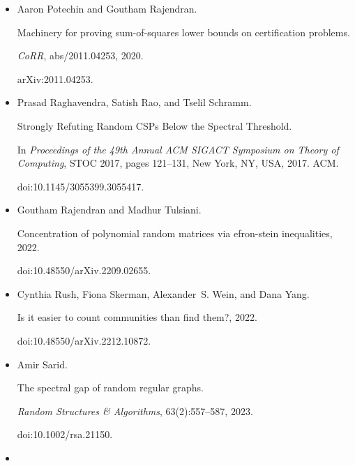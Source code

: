 \documentclass[10pt,a4paper]{article}
\begin{document}
\begin{itemize}
\item[] 
[39]

Aaron Potechin and Goutham Rajendran.


Machinery for proving sum-of-squares lower bounds on certification
problems.


\emph{CoRR}, abs/2011.04253, 2020.


arXiv:2011.04253.





\item[] 
[40]

Prasad Raghavendra, Satish Rao, and Tselil Schramm.


Strongly Refuting Random CSPs Below the Spectral Threshold.


In \emph{Proceedings of the 49th Annual ACM SIGACT Symposium on Theory
of Computing}, STOC 2017, pages 121–131, New York, NY, USA, 2017. ACM.


doi:10.1145/3055399.3055417.





\item[] 
[41]

Goutham Rajendran and Madhur Tulsiani.


Concentration of polynomial random matrices via efron-stein
inequalities, 2022.


doi:10.48550/arXiv.2209.02655.





\item[] 
[42]

Cynthia Rush, Fiona Skerman, Alexander S. Wein, and Dana Yang.


Is it easier to count communities than find them?, 2022.


doi:10.48550/arXiv.2212.10872.





\item[] 
[43]

Amir Sarid.


The spectral gap of random regular graphs.


\emph{Random Structures \& Algorithms}, 63(2):557–587, 2023.


doi:10.1002/rsa.21150.





\item[] 
[44]


\end{itemize}
\end{document}
